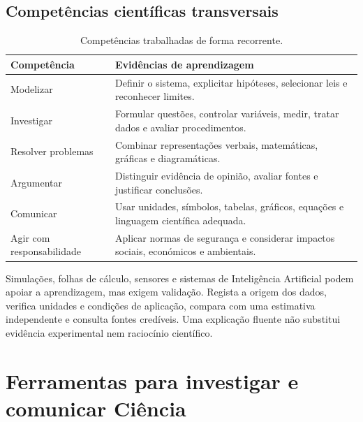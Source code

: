 \documentclass[11pt,a4paper,oneside]{book}
\begin{document}
\normalsize

\chapter*{Competências científicas transversais}
\begin{table}[h!]
\centering
\caption{Competências trabalhadas de forma recorrente.}
\begin{tabularx}{\textwidth}{p{}X}
\toprule
Competência & Evidências de aprendizagem \\
\midrule
Modelizar & Definir o sistema, explicitar hipóteses, selecionar leis e reconhecer limites. \\
Investigar & Formular questões, controlar variáveis, medir, tratar dados e avaliar procedimentos. \\
Resolver problemas & Combinar representações verbais, matemáticas, gráficas e diagramáticas. \\
Argumentar & Distinguir evidência de opinião, avaliar fontes e justificar conclusões. \\
Comunicar & Usar unidades, símbolos, tabelas, gráficos, equações e linguagem científica adequada. \\
Agir com responsabilidade & Aplicar normas de segurança e considerar impactos sociais, económicos e ambientais. \\
\bottomrule
\end{tabularx}
\end{table}

\begin{metodo}[title=Ferramentas digitais e Inteligência Artificial]
Simulações, folhas de cálculo, sensores e sistemas de Inteligência Artificial podem apoiar a aprendizagem, mas exigem validação. Regista a origem dos dados, verifica unidades e condições de aplicação, compara com uma estimativa independente e consulta fontes credíveis. Uma explicação fluente não substitui evidência experimental nem raciocínio científico.
\end{metodo}

\tableofcontents
\mainmatter

\part{Ferramentas para investigar e comunicar Ciência}
\end{document}
